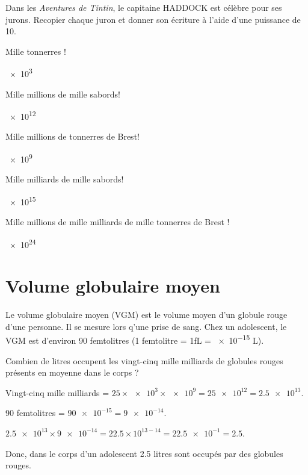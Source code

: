 \documentclass[a4paper,11pt]{exam}
\begin{document}
	Dans les \emph{Aventures de Tintin}, le capitaine HADDOCK est célèbre pour ses jurons. Recopier chaque juron et donner son écriture à l'aide d'une puissance de 10.
	\begin{multicols}{2}

		\begin{questions} %
			
			\question Mille tonnerres !
			\begin{solution}
				\num{e3}
			\end{solution}
			
			\question Mille millions de mille sabords!
			\begin{solution}
				\num{e12}
			\end{solution}
						
			\question Mille millions de tonnerres de Brest!
			\begin{solution}
				\num{e9}
			\end{solution}
			
			\question Mille milliards de mille sabords!
			\begin{solution}
				\num{e15}
			\end{solution}
			
			\question Mille millions de mille milliards de mille tonnerres de Brest !
			\begin{solution}
				\num{e24}
			\end{solution}
		\end{questions}
	\end{multicols}
	
	
\section{Volume globulaire moyen}
	
Le volume globulaire moyen (VGM) est le volume moyen d'un globule rouge d'une personne. Il se mesure lors q'une prise de sang. Chez un adolescent, le VGM est d'environ 90 femtolitres (1 femtolitre = 1fL = \num{e-15} L).

	\begin{questions}
		\question Combien de litres occupent les vingt-cinq mille milliards de globules rouges présents en moyenne dans le corps ?  
		
		\begin{solution}
			Vingt-cinq mille milliards = $25 \times \num{e3} \times \num{e9} = \num{25e12} = \num{2.5e13}$.
			
			90 femtolitres = $\num{90e-15}=\num{9e-14}$.
			
			$\num{2.5e13} \times \num{9e-14} = \num{22.5} \times 10^{13-14} = \num{22.5e-1} = \num{2.5}$.
			
			Donc, dans le corps d'un adolescent \num{2.5} litres sont occupés par des globules rouges. 
		\end{solution}
	\end{questions}
\end{document}
